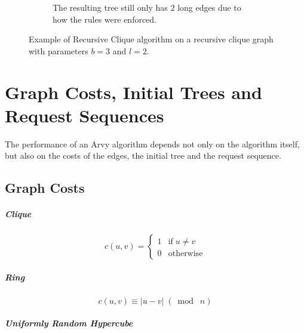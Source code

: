\documentclass[a4paper, oneside]{discothesis}
\begin{document}
\begin{figure}
\begin{subfigure}[t]{0.5\textwidth}
\caption{The resulting tree still only has $2$ long edges due to how the rules were enforced.}
\end{subfigure}
\caption{Example of Recursive Clique algorithm on a recursive clique graph with parameters $b=3$ and $l=2$.}
\label{fig:reclique-alg}
\end{figure}

\chapter{Graph Costs, Initial Trees and Request Sequences}

The performance of an Arvy algorithm depends not only on the algorithm itself, but also on the costs of the edges, the initial tree and the request sequence.

\section{Graph Costs}

\paragraph{Clique}

\begin{equation}
c(u,v)=
\begin{cases}
1 & \text{if}\;u\neq v \\
0 & \text{otherwise}
\end{cases}
\end{equation}

\paragraph{Ring}

\begin{equation}
c(u,v)\equiv|u-v|\;(\bmod\;n)
\end{equation}

\paragraph{Uniformly Random Hypercube}
\end{document}
